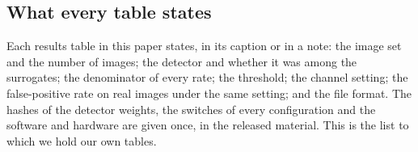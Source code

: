 \subsection{What every table states}
\label{sec:checklist}

Each results table in this paper states, in its caption or in a note: the image set and the number
of images; the detector and whether it was among the surrogates; the denominator of every rate; the
threshold; the channel setting; the false-positive rate on real images under the same setting; and
the file format. The hashes of the detector weights, the switches of every configuration and the
software and hardware are given once, in the released material. This is the list to which we hold
our own tables.
